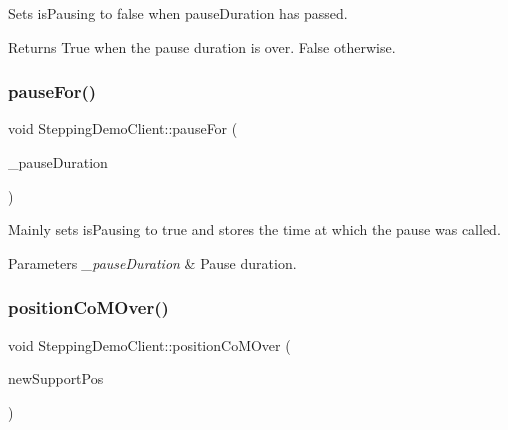 Sets is\+Pausing to false when pause\+Duration has passed.

\begin{DoxyReturn}{Returns}
True when the pause duration is over. False otherwise. 
\end{DoxyReturn}
\hypertarget{classSteppingDemoClient_a6b5d8bf0ce08c8b9f66ac2c1bbd5bcd7}{}\label{classSteppingDemoClient_a6b5d8bf0ce08c8b9f66ac2c1bbd5bcd7} 
\subsubsection{\texorpdfstring{pause\+For()}{pauseFor()}}
{\footnotesize\ttfamily void Stepping\+Demo\+Client\+::pause\+For (\begin{DoxyParamCaption}\item[{double}]{\+\_\+pause\+Duration }\end{DoxyParamCaption})\hspace{0.3cm}{\ttfamily [private]}}

Mainly sets is\+Pausing to true and stores the time at which the pause was called.


\begin{DoxyParams}{Parameters}
{\em \+\_\+pause\+Duration} & Pause duration. \\
\hline
\end{DoxyParams}
\hypertarget{classSteppingDemoClient_a18609e5634a283423c228106bb0e3a45}{}\label{classSteppingDemoClient_a18609e5634a283423c228106bb0e3a45} 
\subsubsection{\texorpdfstring{position\+Co\+M\+Over()}{positionCoMOver()}}
{\footnotesize\ttfamily void Stepping\+Demo\+Client\+::position\+Co\+M\+Over (\begin{DoxyParamCaption}\item[{\hyperlink{SteppingDemoClient_8h_ac0c3848a609566394821d9826e0fdd5b}{C\+O\+M\+\_\+\+S\+U\+P\+P\+O\+R\+T\+\_\+\+P\+O\+S\+I\+T\+I\+ON}}]{new\+Support\+Pos }\end{DoxyParamCaption})\hspace{0.3cm}{\ttfamily [private]}}

